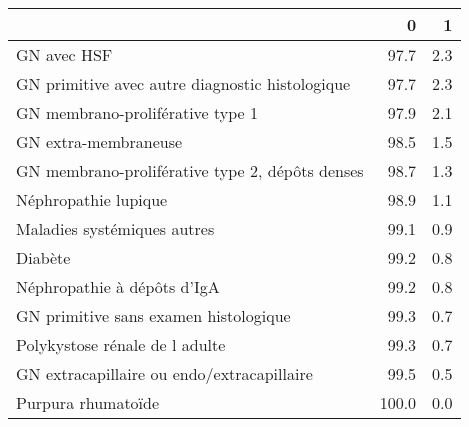 \documentclass[11pt,a4paper]{article}\usepackage[]{graphicx}\usepackage[]{color}
\begin{document}
\begin{table}[H]
\centering
\begin{tabular}{lrr}
  \hline
 & 0 & 1 \\ 
  \hline
GN avec HSF & 97.7 & 2.3 \\ 
  GN primitive avec autre diagnostic histologique & 97.7 & 2.3 \\ 
  GN membrano-proliférative type 1 & 97.9 & 2.1 \\ 
  GN extra-membraneuse & 98.5 & 1.5 \\ 
  GN membrano-proliférative type 2, dépôts denses & 98.7 & 1.3 \\ 
  Néphropathie lupique & 98.9 & 1.1 \\ 
  Maladies systémiques autres & 99.1 & 0.9 \\ 
  Diabète & 99.2 & 0.8 \\ 
  Néphropathie à dépôts d'IgA & 99.2 & 0.8 \\ 
  GN primitive sans examen histologique & 99.3 & 0.7 \\ 
  Polykystose rénale de l adulte & 99.3 & 0.7 \\ 
  GN extracapillaire ou endo/extracapillaire & 99.5 & 0.5 \\ 
  Purpura rhumatoïde & 100.0 & 0.0 \\ 
   \hline
\end{tabular}
\end{table}

~\\
\end{document}
